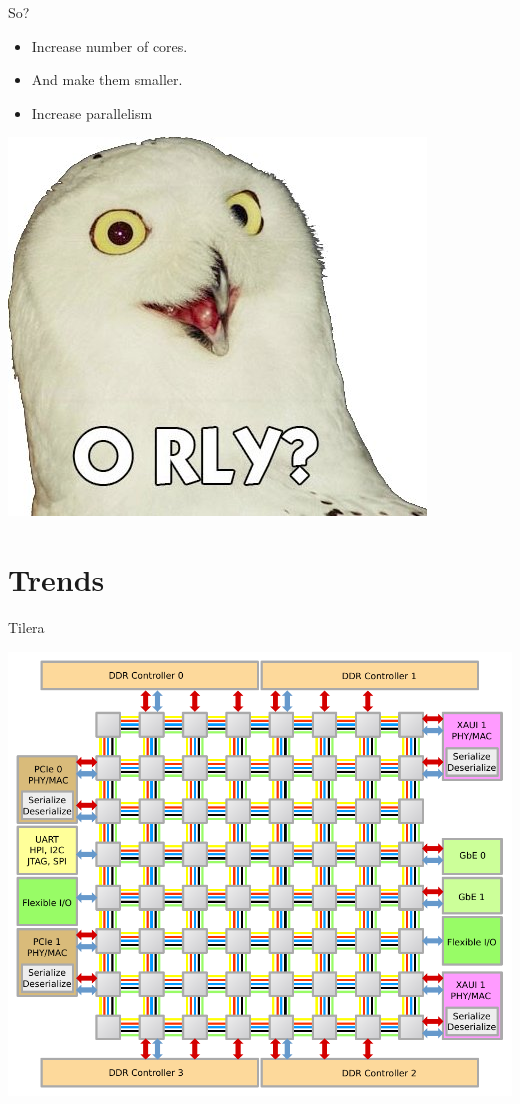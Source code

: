 \documentclass[14pt]{beamer}
\begin{document}
\begin{frame}{So?}
    \begin{itemize}
        \item Increase number of cores.
        \item And make them smaller.
            \pause
        \item \alert{Increase parallelism}
    \end{itemize}
    \includegraphics[height=0.2\textheight]{images/orly.jpg}
\end{frame}

\section{Trends}

\begin{frame}{Tilera}
    \pause
    \begin{center}
        \includegraphics[height=0.8\textheight]{images/tile64.pdf}
    \end{center}
\end{frame}
\end{document}
